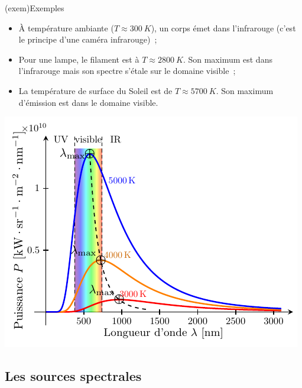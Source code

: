 \documentclass[../../main/main.tex]{subfiles}
\begin{document}
\begin{tcb*}[sidebyside, lefthand ratio=.5](exem){Exemples}
	\begin{itemize}
		\item À température ambiante ($T \approx \SI{300}{K}$), un corps émet
		      dans l'infrarouge (c'est le principe d'une caméra infrarouge)~;
		\item Pour une lampe, le filament est à $T \approx \SI{2800}{K}$. Son
		      maximum est dans l'infrarouge mais son spectre s'étale sur le
		      domaine visible~;
		\item La température de surface du Soleil est de $T \approx
			      \SI{5700}{K}$. Son maximum d'émission est dans le domaine visible.
	\end{itemize}
	\begin{center}
		\pgfspectra[element={H,Fe,Mg,Na},
		absorption, line intensity=40, Imin=.05,
		axis, axis color=white, axis font color=black,
		axis ticks=4, axis unit precision=2,
		axis label text={Longueur d'onde [$\si{nm}$]},
		back=visible10,
		]
		\label{fig:spec_sun}
	\end{center}
	\tcblower
	\begin{center}
		\includegraphics[width=\linewidth]{blackbody}
		\label{fig:cps_chaud}
	\end{center}
\end{tcb*}

\subsection{Les sources spectrales}
\end{document}
